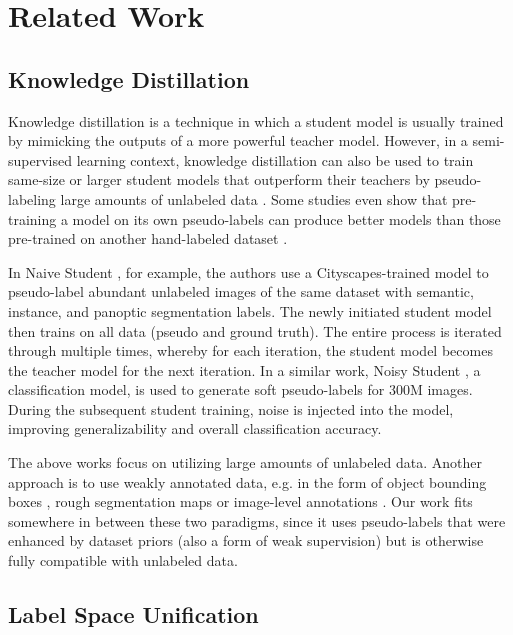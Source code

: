 \section{Related Work}
\subsection{Knowledge Distillation}
Knowledge distillation is a technique in which a student model is usually trained by mimicking the outputs of a more powerful teacher model.
However, in a semi-supervised learning context, knowledge distillation can also be used to train same-size or larger student models that outperform their teachers by pseudo-labeling large amounts of unlabeled data \cite{bib:billion-scale, bib:naive-student, bib:noisy-student, bib:mean-teacher, bib:pp-liteseg, bib:meta-pseudo-labels, bib:data-distillation}.
Some studies even show that pre-training a model on its own pseudo-labels can produce better models than those pre-trained on another hand-labeled dataset \cite{bib:rethinking-pretraining, bib:depth-anything}.

In Naive Student \cite{bib:naive-student}, for example, the authors use a Cityscapes-trained model to pseudo-label abundant unlabeled images of the same dataset with semantic, instance, and panoptic segmentation labels.
The newly initiated student model then trains on all data (pseudo and ground truth).
The entire process is iterated through multiple times, whereby for each iteration, the student model becomes the teacher model for the next iteration.
In a similar work, Noisy Student \cite{bib:noisy-student}, a classification model, is used to generate soft pseudo-labels for 300M images.
During the subsequent student training, noise is injected into the model, improving generalizability and overall classification accuracy.

The above works focus on utilizing large amounts of unlabeled data.
Another approach is to use weakly annotated data, e.g. in the form of object bounding boxes \cite{bib:weakly-and-semi-supervised-learning, bib:boosting-ssss, bib:bbam}, rough segmentation maps \cite{bib:urban-scene-coarse-annotation} or image-level annotations \cite{bib:weakly-and-semi-supervised-learning, bib:boosting-ssss, bib:image-level-weak-supervision}.
Our work fits somewhere in between these two paradigms, since it uses pseudo-labels that were enhanced by dataset priors (also a form of weak supervision) but is otherwise fully compatible with unlabeled data.

\subsection{Label Space Unification}

